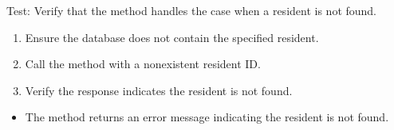 \documentclass[letterpaper,10pt,english]{sphinxmanual}
\begin{document}
\begin{fulllineitems}
\label{\detokenize{test:test.test_residetnt.test_update_resident_birthdate_not_found}}
\pysigstartsignatures
\pysiglinewithargsret
{}
{}
{}
\pysigstopsignatures
\sphinxAtStartPar
Test: Verify that the method handles the case when a resident is not found.
\begin{description}
\begin{enumerate}
%
\item {} 
\sphinxAtStartPar
Ensure the database does not contain the specified resident.

\item {} 
\sphinxAtStartPar
Call the  method with a non\sphinxhyphen{}existent resident ID.

\item {} 
\sphinxAtStartPar
Verify the response indicates the resident is not found.

\end{enumerate}

\begin{itemize}
\item {} 
\sphinxAtStartPar
The method returns an error message indicating the resident is not found.

\end{itemize}

\end{description}

\end{fulllineitems}

\end{document}
